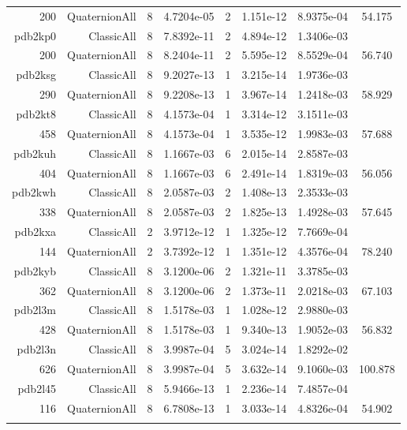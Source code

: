 \begin{xltabular}{\textwidth}{r|rcS[table-format=1.4e+2]cS[table-format=1.3e+2]S[table-format=1.4e+2]S[table-format=-1.3]}
200 & QuaternionAll & 8 & 4.7204e-05 & 2 & 1.151e-12 & 8.9375e-04 & 54.175\\  \addlinespace
pdb2kp0 & ClassicAll & 8 & 7.8392e-11 & 2 & 4.894e-12 & 1.3406e-03 & \\
200 & QuaternionAll & 8 & 8.2404e-11 & 2 & 5.595e-12 & 8.5529e-04 & 56.740\\  \addlinespace
pdb2ksg & ClassicAll & 8 & 9.2027e-13 & 1 & 3.215e-14 & 1.9736e-03 & \\
290 & QuaternionAll & 8 & 9.2208e-13 & 1 & 3.967e-14 & 1.2418e-03 & 58.929\\  \addlinespace
pdb2kt8 & ClassicAll & 8 & 4.1573e-04 & 1 & 3.314e-12 & 3.1511e-03 & \\
458 & QuaternionAll & 8 & 4.1573e-04 & 1 & 3.535e-12 & 1.9983e-03 & 57.688\\  \addlinespace
pdb2kuh & ClassicAll & 8 & 1.1667e-03 & 6 & 2.015e-14 & 2.8587e-03 & \\
404 & QuaternionAll & 8 & 1.1667e-03 & 6 & 2.491e-14 & 1.8319e-03 & 56.056\\  \addlinespace
pdb2kwh & ClassicAll & 8 & 2.0587e-03 & 2 & 1.408e-13 & 2.3533e-03 & \\
338 & QuaternionAll & 8 & 2.0587e-03 & 2 & 1.825e-13 & 1.4928e-03 & 57.645\\  \addlinespace
pdb2kxa & ClassicAll & 2 & 3.9712e-12 & 1 & 1.325e-12 & 7.7669e-04 & \\
144 & QuaternionAll & 2 & 3.7392e-12 & 1 & 1.351e-12 & 4.3576e-04 & 78.240\\  \addlinespace
pdb2kyb & ClassicAll & 8 & 3.1200e-06 & 2 & 1.321e-11 & 3.3785e-03 & \\
362 & QuaternionAll & 8 & 3.1200e-06 & 2 & 1.373e-11 & 2.0218e-03 & 67.103\\  \addlinespace
pdb2l3m & ClassicAll & 8 & 1.5178e-03 & 1 & 1.028e-12 & 2.9880e-03 & \\
428 & QuaternionAll & 8 & 1.5178e-03 & 1 & 9.340e-13 & 1.9052e-03 & 56.832\\  \addlinespace
pdb2l3n & ClassicAll & 8 & 3.9987e-04 & 5 & 3.024e-14 & 1.8292e-02 & \\
626 & QuaternionAll & 8 & 3.9987e-04 & 5 & 3.632e-14 & 9.1060e-03 & 100.878\\  \addlinespace
pdb2l45 & ClassicAll & 8 & 5.9466e-13 & 1 & 2.236e-14 & 7.4857e-04 & \\
116 & QuaternionAll & 8 & 6.7808e-13 & 1 & 3.033e-14 & 4.8326e-04 & 54.902\\  \addlinespace

\end{xltabular}
